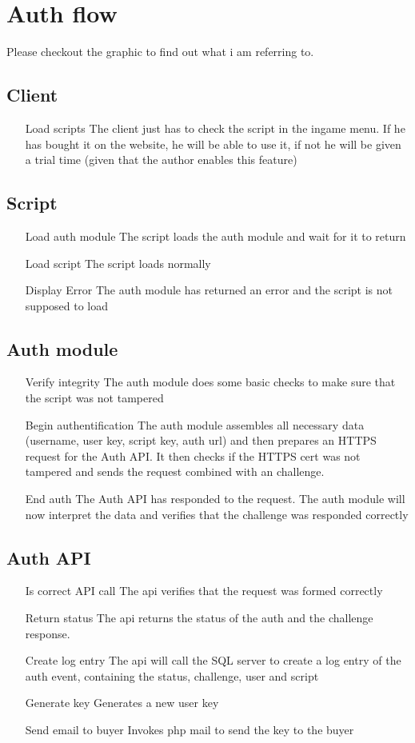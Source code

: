 \documentclass{article}
\begin{document}
\section{Auth flow}
Please checkout the graphic to find out what i am referring to.
\subsection{Client}
\begin{itemize}
	\item[Load scripts] 
	The client just has to check the script in the ingame menu.
	If he has bought it on the website, he will be able to use it, if not he will be given a trial time (given that the author enables this feature)
\end{itemize}
\subsection{Script}
\begin{itemize}
	\item[Load auth module] The script loads the auth module and wait for it to return
	\item[Load script] The script loads normally
	\item[Display Error] The auth module has returned an error and the script is not supposed to load
\end{itemize}
\subsection{Auth module}
\begin{itemize}
	\item[Verify integrity] The auth module does some basic checks to make sure that the script was not tampered
	\item[Begin authentification] The auth module assembles all necessary data (username, user key, script key, auth url) and then prepares an HTTPS request for the Auth API. It then checks if the HTTPS cert was not tampered and sends the request combined with an challenge.
	\item[End auth] The Auth API has responded to the request. The auth module will now interpret the data and verifies that the challenge was responded correctly
\end{itemize}
\subsection{Auth API}
\begin{itemize}
	\item[Is correct API call] The api verifies that the request was formed correctly
	\item[Return status] The api returns the status of the auth and the challenge response.
	\item[Create log entry] The api will call the SQL server to create a log entry of the auth event, containing the status, challenge, user and script
	\item[Generate key] Generates a new user key
	\item[Send email to buyer] Invokes php mail to send the key to the buyer
\end{itemize}
\end{document}
